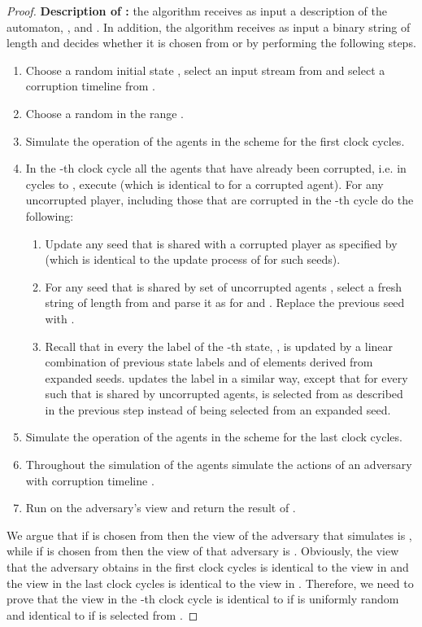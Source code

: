 \documentclass[letterpaper,11pt]{article}
\begin{document}
\begin{proof}
\medskip
\noindent
{\bf Description of :} the algorithm receives as input a description of the automaton, ,  and . In addition, the algorithm receives as input a binary string  of length  and decides whether it is chosen from  or  by performing the following steps.
\begin{enumerate}
\item Choose a random initial state , select an input stream  from  and select a corruption timeline  from .
\item Choose a random  in the range .
\item Simulate the operation of the agents  in the scheme  for the first  clock cycles.
\item In the -th clock cycle all the agents that have already been corrupted, i.e. in cycles  to , execute  (which is identical to  for a corrupted agent). For any uncorrupted player, including those that are corrupted in the -th cycle do the following:
\begin{enumerate}
\item Update any seed that is shared with a corrupted player as specified by  (which is identical to the update process of  for such seeds).
\item For any seed that is shared by set of uncorrupted agents , select a fresh string of length  from  and parse it as  for  and . Replace the previous seed with . 
\item Recall that in every  the label of the -th state, , is updated by a linear combination of previous state labels and of elements  derived from expanded seeds.  updates the label in a similar way, except that for every  such that  is shared by uncorrupted agents,  is selected from  as described in the previous step instead of being selected from an expanded seed.  
\end{enumerate}
\item Simulate the operation of the agents  in the scheme  for the last  clock cycles.
\item Throughout the simulation of the agents simulate the actions of an adversary with corruption timeline .
\item Run  on the adversary's view and return the result of .
\end{enumerate}

We argue that if  is chosen from  then the view of the adversary that  simulates is , while if  is chosen from  then the view of that adversary is . Obviously, the view that the adversary obtains in the first  clock cycles is identical to the view in  and the view in the last  clock cycles is identical to the view in . Therefore, we need to prove that the view in the -th clock cycle is identical to  if  is uniformly random and identical to  if  is selected from .


\end{proof}
\end{document}
